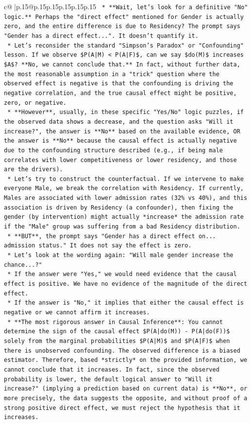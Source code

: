 \documentclass{article}
\begin{document}
{\begin{supertabular}{c@{$\;$}|p{.15\linewidth}@{}p{.15\linewidth}p{.15\linewidth}p{.15\linewidth}p{.15\linewidth}p{.15\linewidth}}
{{{\texttt{    *   **Wait, let's look for a definitive "No" logic.** Perhaps the "direct effect" mentioned for Gender is actually zero, and the entire difference is due to Residency? The prompt says "Gender has a direct effect...". It doesn't quantify it.} \\
\texttt{    *   Let's reconsider the standard "Simpson's Paradox" or "Confounding" lesson. If we observe \$P(A|M) < P(A|F)\$, can we say \$do(M)\$ increases \$A\$? **No, we cannot conclude that.** In fact, without further data, the most reasonable assumption in a "trick" question where the observed effect is negative is that the confounding is driving the negative correlation, and the true causal effect might be positive, zero, or negative.} \\
\texttt{    *   **However**, usually, in these specific "Yes/No" logic puzzles, if the observed data shows a decrease, and the question asks "Will it increase?", the answer is **No** based on the available evidence, OR the answer is **No** because the causal effect is actually negative due to the confounding structure described (e.g., if being male correlates with lower competitiveness or lower residency, and those are the drivers).} \\
\texttt{    *   Let's try to construct the counterfactual. If we intervene to make everyone Male, we break the correlation with Residency. If currently, Males are associated with lower admission rates (32\% vs 40\%), and this association is driven by Residency (a confounder), then fixing the gender (by intervention) might actually *increase* the admission rate if the "Male" group was suffering from a bad Residency distribution.} \\
\texttt{    *   **BUT**, the prompt says "Gender has a direct effect on... admission status." It does not say the effect is zero.} \\
\texttt{    *   Let's look at the wording again: "Will male gender increase the chance...?"} \\
\texttt{    *   If the answer were "Yes," we would need evidence that the causal effect is positive. We have no evidence of the magnitude of the direct effect.} \\
\texttt{    *   If the answer is "No," it implies that either the causal effect is negative or we cannot affirm it increases.} \\
\texttt{    *   **The most rigorous answer in Causal Inference**: You cannot determine the sign of the causal effect \$P(A|do(M)) {-} P(A|do(F))\$ solely from the marginal probabilities \$P(A|M)\$ and \$P(A|F)\$ when there is unobserved confounding. The observed difference is a biased estimator. Therefore, based *strictly* on the provided information, we cannot conclude that it increases. In fact, since the observed probability is lower, the default logical answer to "Will it increase?" (implying a prediction based on current data) is **No**, or more precisely, the data suggests the opposite, and without proof of a strong positive direct effect, we must reject the hypothesis that it increases.} \\
}}}
\end{supertabular}}
\end{document}
